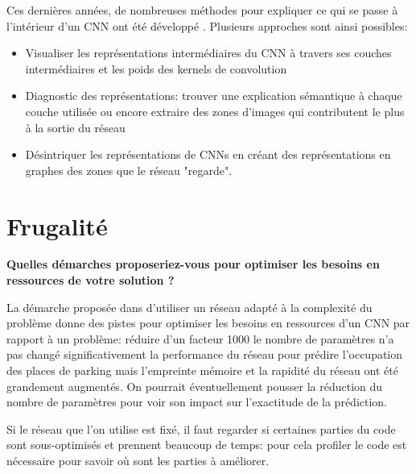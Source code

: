 \documentclass[12pt]{article}
\begin{document}
Ces dernières années, de nombreuses méthodes pour expliquer ce qui se passe à l'intérieur d'un CNN ont été développé \cite{zhang2018}. Plusieurs approches sont ainsi possibles:

\begin{itemize}
    \item Visualiser les représentations intermédiaires du CNN à travers ses couches intermédiaires et les poids des kernels de convolution
    \item Diagnostic des représentations: trouver une explication sémantique à chaque couche utilisée ou encore extraire des zones d'images qui contributent le plus à la sortie du réseau
    \item Désintriquer les représentations de CNNs en créant des représentations en graphes des zones que le réseau "regarde".
\end{itemize}

\section{Frugalité}

\textbf{Quelles démarches proposeriez-vous pour optimiser les besoins en ressources de votre solution ?}

La démarche proposée dans \cite{Amato2017} d'utiliser un réseau adapté à la complexité du problème donne des pistes pour optimiser les besoins en ressources d'un CNN par rapport à un problème: réduire d'un facteur 1000 le nombre de paramètres n'a pas changé significativement la performance du réseau pour prédire l'occupation des places de parking mais l'empreinte mémoire et la rapidité du réseau ont été grandement augmentés. On pourrait éventuellement pousser la réduction du nombre de paramètres pour voir son impact sur l'exactitude de la prédiction.

Si le réseau que l'on utilise est fixé, il faut regarder si certaines parties du code sont sous-optimisés et prennent beaucoup de temps: pour cela profiler le code est nécessaire pour savoir où sont les parties à améliorer.

\clearpage



\end{document}
